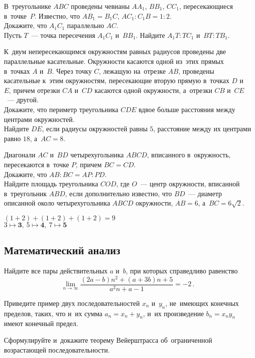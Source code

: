 \begin{problems}

В~треугольнике $ABC$ проведены чевианы $A A_1$, $B B_1$, $C C_1$,
пересекающиеся в~точке~$P$.
Известно, что $A B_1 = B_1 C$, $A C_1 : C_1 B = 1 : 2$.
\\
\subproblem
Докажите, что $A_1 C_1$ параллельно $AC$.
\\
\subproblem
Пусть $T$~--- точка пересечения $A_1 C_1$ и~$B B_1$.
Найдите $A_1 T : T C_1$ и~$B T : T B_1$.

К~двум непересекающимся окружностям равных радиусов проведены две параллельные
касательные.
Окружности касаются одной из~этих прямых в~точках $A$ и~$B$.
Через точку $C$, лежащую на~отрезке $AB$, проведены касательные к~этим
окружностям, пересекающие вторую прямую в~точках $D$ и~$E$, причем отрезки $CA$
и~$CD$ касаются одной окружности, а~отрезки $CB$ и~$CE$~--- другой.
\\
\subproblem
Докажите, что периметр треугольника $CDE$ вдвое больше расстояния между
центрами окружностей.
\\
\subproblem
Найдите $DE$, если радиусы окружностей равны $5$, расстояние между их центрами
равно $18$, а~$AC = 8$.

Диагонали $AC$ и~$BD$ четырехугольника $ABCD$, вписанного в~окружность,
пересекаются в~точке $P$, причем $BC = CD$.
\\
\subproblem
Докажите, что $AB : BC = AP : PD$.
\\
\subproblem
Найдите площадь треугольника $COD$, где $O$~--- центр окружности, вписанной
в~треугольник $ABD$, если дополнительно известно, что $BD$~--- диаметр
описанной около четырехугольника $ABCD$ окружности, $AB = 6$, а~$BC = 6
\sqrt{2}$.

\end{problems}

\begin{flushright}\scriptsize
\((1+2)+(1+2)+(1+2) = 9\)%
\\
\(3 \mapsto \mathbf{3},\ 5 \mapsto \mathbf{4},\ 7 \mapsto \mathbf{5}\)%
\end{flushright}

\subsection*{Математический анализ}

\begin{problems}

Найдите все пары действительных $a$ и~$b$, при которых справедливо равенство
\[
    \lim\limits_{n \to \infty}
        \frac{(2 a - b) n^2 + (a + 3 b) n + 5}{a^2 n + a - 1}
=
    -2
\, . \]

Приведите пример двух последовательностей $x_n$ и~$y_n$, не~имеющих конечных
пределов, таких, что и~их сумма $a_n=x_n+y_n$, и~их произведение $b_n=x_ny_n$
имеют конечный предел.

Сформулируйте и~докажите теорему Вейерштрасса об~ограниченной возрастающей
последовательности.

\end{problems}

